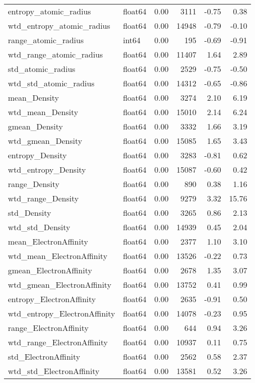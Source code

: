 \begin{tabular}{llrrrr}
entropy_atomic_radius & float64 & 0.00 & 3111 & -0.75 & 0.38 \\
wtd_entropy_atomic_radius & float64 & 0.00 & 14948 & -0.79 & -0.10 \\
range_atomic_radius & int64 & 0.00 & 195 & -0.69 & -0.91 \\
wtd_range_atomic_radius & float64 & 0.00 & 11407 & 1.64 & 2.89 \\
std_atomic_radius & float64 & 0.00 & 2529 & -0.75 & -0.50 \\
wtd_std_atomic_radius & float64 & 0.00 & 14312 & -0.65 & -0.86 \\
mean_Density & float64 & 0.00 & 3274 & 2.10 & 6.19 \\
wtd_mean_Density & float64 & 0.00 & 15010 & 2.14 & 6.24 \\
gmean_Density & float64 & 0.00 & 3332 & 1.66 & 3.19 \\
wtd_gmean_Density & float64 & 0.00 & 15085 & 1.65 & 3.43 \\
entropy_Density & float64 & 0.00 & 3283 & -0.81 & 0.62 \\
wtd_entropy_Density & float64 & 0.00 & 15087 & -0.60 & 0.42 \\
range_Density & float64 & 0.00 & 890 & 0.38 & 1.16 \\
wtd_range_Density & float64 & 0.00 & 9279 & 3.32 & 15.76 \\
std_Density & float64 & 0.00 & 3265 & 0.86 & 2.13 \\
wtd_std_Density & float64 & 0.00 & 14939 & 0.45 & 2.04 \\
mean_ElectronAffinity & float64 & 0.00 & 2377 & 1.10 & 3.10 \\
wtd_mean_ElectronAffinity & float64 & 0.00 & 13526 & -0.22 & 0.73 \\
gmean_ElectronAffinity & float64 & 0.00 & 2678 & 1.35 & 3.07 \\
wtd_gmean_ElectronAffinity & float64 & 0.00 & 13752 & 0.41 & 0.99 \\
entropy_ElectronAffinity & float64 & 0.00 & 2635 & -0.91 & 0.50 \\
wtd_entropy_ElectronAffinity & float64 & 0.00 & 14078 & -0.23 & 0.95 \\
range_ElectronAffinity & float64 & 0.00 & 644 & 0.94 & 3.26 \\
wtd_range_ElectronAffinity & float64 & 0.00 & 10937 & 0.11 & 0.75 \\
std_ElectronAffinity & float64 & 0.00 & 2562 & 0.58 & 2.37 \\
wtd_std_ElectronAffinity & float64 & 0.00 & 13581 & 0.52 & 3.26 \\

\end{tabular}
